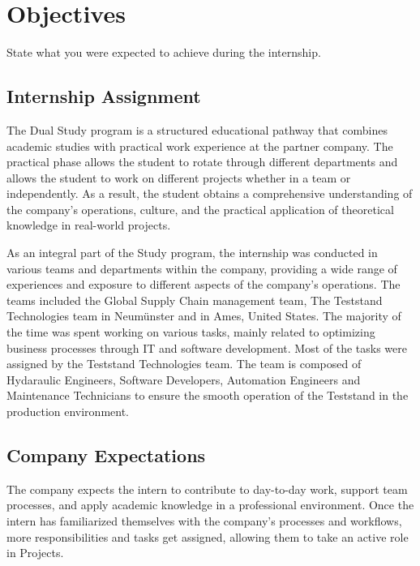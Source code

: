 \chapter{Objectives}
\label{chap:objectives}

State what you were expected to achieve during the internship.

\section{Internship Assignment}

The Dual Study program is a structured educational pathway that combines academic studies with practical work experience at the partner company. The practical phase allows the student to rotate through different departments and allows the student to work on different projects whether in a team or independently. As a result, the student obtains a comprehensive understanding of the company's operations, culture, and the practical application of theoretical knowledge in real-world projects.

As an integral part of the Study program, the internship was conducted in various teams and departments within the company, providing a wide range of experiences and exposure to different aspects of the company's operations. The teams included the Global Supply Chain management team, The Teststand Technologies team in Neumünster and in Ames, United States.
The majority of the time was spent working on various tasks, mainly related to optimizing business processes through \ac{IT} and software development. 
Most of the tasks were assigned by the Teststand Technologies team. The team is composed of Hydaraulic Engineers, Software Developers, Automation Engineers and Maintenance Technicians to ensure the smooth operation of the Teststand in the production environment. 



\section{Company Expectations}

The company expects the intern to contribute to day-to-day work, support team processes, and apply academic knowledge in a professional environment.
Once the intern has familiarized themselves with the company's processes and workflows, more responsibilities and tasks get assigned, allowing them to take an active role in Projects. 



